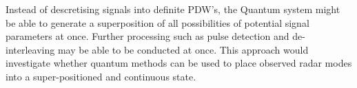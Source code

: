Instead of descretising signals into definite PDW's, the Quantum system might be able to generate a superposition of all possibilities of potential signal parameters at once. Further processing such as pulse detection and de-interleaving may be able to be conducted at once. This approach would investigate whether quantum methods can be used to place observed radar modes into a super-positioned and continuous state.